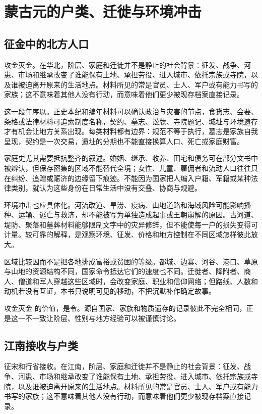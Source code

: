 \section{蒙古元的户类、迁徙与环境冲击}

\subsection{征金中的北方人口}

攻金灭金。在华北，阶层、家庭和迁徙并不是静止的社会背景：征发、战争、河患、市场和继承改变了谁能保有土地、承担劳役、进入城市、依托宗族或寺院，以及谁被迫离开原来的生活地点。材料所见的常是官员、士人、军户或有能力书写的家族；这不意味着其他人没有行动，而意味着他们更少被现存档案直接记录。

这一段年序以。正史本纪和编年材料可以确认政治与灾害的节点，食货志、会要、条格或法律材料可追索制度名称，契约、墓志、讼牍、寺院题记、城址与环境遗存才有机会让地方关系出现。每类材料都有边界：规范不等于执行，墓志是家族自我呈现，契约是一次交易，遗址的分期也不能直接换算人口、死亡或家庭财富。

家庭史尤其需要抵抗整齐的叙述。婚姻、继承、收养、田宅和债务可在部分文书中被辨认，但保存密集的区域不能替代全境；女性、儿童、雇佣者和流动人口往往只在纠纷、追赠或赈济的边缘留下痕迹。不能因为国家把人编入户籍、军籍或某种法律类别，就认为这些身份在日常生活中没有交叠、协商与规避。

环境冲击也应具体化。河流改道、旱涝、疫病、山地道路和海域风险可能影响播种、运输、逃亡与救济，却不能被写为单独造成起事或王朝崩解的原因。古河道、堤防、聚落和墓葬材料能够限制文字中的灾异修辞，但不能使每一户的损失变得可计量。较可靠的解释，是观察环境、征发、价格和地方控制在不同区域怎样彼此放大。

区域比较因而不是把各地排成富裕或贫困的等级。都城、边寨、河谷、港口、草原与山地的资源结构不同，国家命令抵达它们的速度也不同。迁徙者、降附者、商人、僧道和军人穿越这些区域时，会改变家庭、职业和信仰网络；但路线、人数和动机若没有互证，本书只说明可见的移动，不把沉默补作确定故事。

攻金灭金 的价值，是令。源自国家、家族和物质遗存的记录彼此不完全相同，正是这一不一致让阶层、性别与地方经验可以被谨慎讨论。

\subsection{江南接收与户类}

征宋和行省接收。在江南，阶层、家庭和迁徙并不是静止的社会背景：征发、战争、河患、市场和继承改变了谁能保有土地、承担劳役、进入城市、依托宗族或寺院，以及谁被迫离开原来的生活地点。材料所见的常是官员、士人、军户或有能力书写的家族；这不意味着其他人没有行动，而意味着他们更少被现存档案直接记录。

